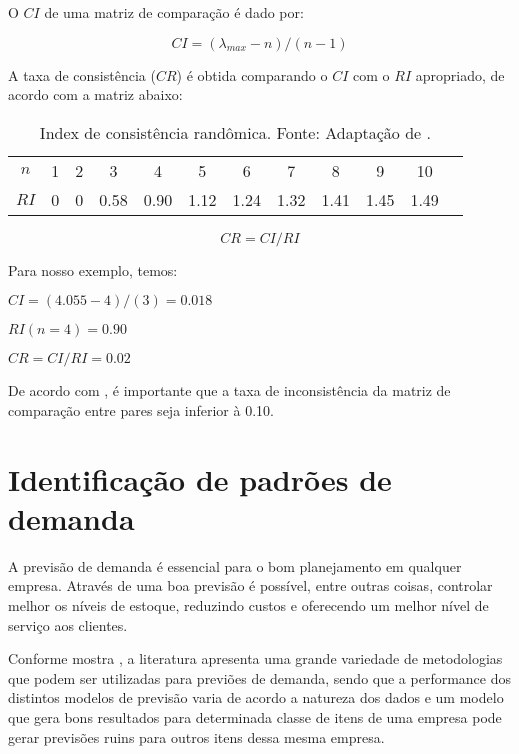 \documentclass{book}
\begin{document}
O $CI$ de uma matriz de comparação é dado por:

\begin{equation}
CI = (\lambda_{max} - n) / (n-1)
\end{equation}

A taxa de consistência ($CR$) é obtida comparando o $CI$ com o $RI$ apropriado, de acordo com a matriz abaixo:

\begin{table}[h]
\begin{center}
\begin{tabular}[c]{c c c c c c c c c c c c}
$n$ & 1 & 2 & 3 & 4 & 5 & 6 & 7 & 8 & 9 & 10 \\
$RI$ & 0 & 0 & 0.58 & 0.90 & 1.12 & 1.24 & 1.32 & 1.41 & 1.45 & 1.49 \\
\end{tabular}
\caption{Index de consistência randômica. Fonte: Adaptação de \cite{Saaty1987}.}
\label{tab:classABCMult}
\end{center}
\end{table}

\begin{equation}
CR = CI / RI
\end{equation}

Para nosso exemplo, temos:

$CI = (4.055 - 4) / (3) =  0.018 $

$RI(n=4) = 0.90$

$CR = CI / RI = 0.02$

De acordo com \cite{Saaty1987}, é importante que a taxa de inconsistência da matriz de comparação entre pares seja inferior à 0.10.

\chapter{Identificação de padrões de demanda}
\label{ch:demandPatter}

A previsão de demanda é essencial para o bom planejamento em qualquer empresa. Através de uma boa previsão é possível, entre outras coisas, controlar melhor os níveis de estoque, reduzindo custos e oferecendo um melhor nível de serviço aos clientes. 

Conforme mostra \cite{MakridakisHibon2000}, a literatura apresenta uma grande variedade de metodologias que podem ser utilizadas para previões de demanda, sendo que a performance dos distintos modelos de previsão varia de acordo a natureza dos dados e um modelo que gera bons resultados para determinada classe de itens de uma empresa pode gerar previsões ruins para outros itens dessa mesma empresa.
\end{document}
